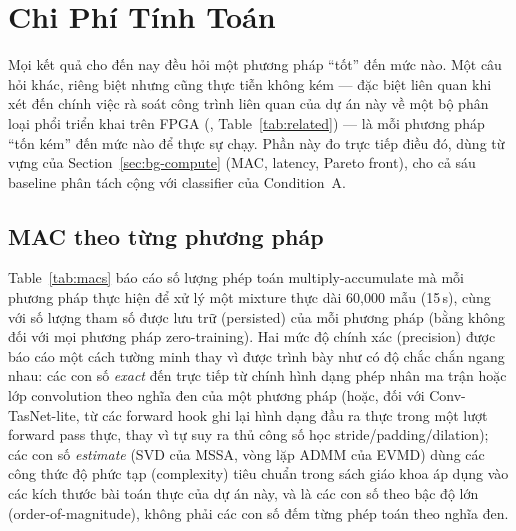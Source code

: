 \documentclass[11pt]{article}
\begin{document}
\section{Chi Phí Tính Toán}
\label{sec:compute}

Mọi kết quả cho đến nay đều hỏi một phương pháp ``tốt'' đến mức nào. Một
câu hỏi khác, riêng biệt nhưng cũng thực tiễn không kém --- đặc biệt liên
quan khi xét đến chính việc rà soát công trình liên quan của dự án này về
một bộ phân loại phổi triển khai trên FPGA (\cite{edgelung},
Table~\ref{tab:related}) --- là mỗi phương pháp ``tốn kém'' đến mức nào
để thực sự chạy. Phần này đo trực tiếp điều đó, dùng từ vựng của
Section~\ref{sec:bg-compute} (MAC, latency, Pareto front), cho cả sáu
baseline phân tách cộng với classifier của Condition~A.

\subsection{MAC theo từng phương pháp}
\label{sec:macs}

Table~\ref{tab:macs} báo cáo số lượng phép toán multiply-accumulate mà
mỗi phương pháp thực hiện để xử lý một mixture thực dài 60{,}000 mẫu
(15\,s), cùng với số lượng tham số được lưu trữ (persisted) của mỗi
phương pháp (bằng không đối với mọi phương pháp zero-training). Hai mức
độ chính xác (precision) được báo cáo một cách tường minh thay vì được
trình bày như có độ chắc chắn ngang nhau: các con số \emph{exact} đến
trực tiếp từ chính hình dạng phép nhân ma trận hoặc lớp convolution theo
nghĩa đen của một phương pháp (hoặc, đối với Conv-TasNet-lite, từ các
forward hook ghi lại hình dạng đầu ra thực trong một lượt forward pass
thực, thay vì tự suy ra thủ công số học stride/padding/dilation); các
con số \emph{estimate} (SVD của MSSA, vòng lặp ADMM của EVMD) dùng các
công thức độ phức tạp (complexity) tiêu chuẩn trong sách giáo khoa áp
dụng vào các kích thước bài toán thực của dự án này, và là các con số
theo bậc độ lớn (order-of-magnitude), không phải các con số đếm từng
phép toán theo nghĩa đen.
\end{document}
